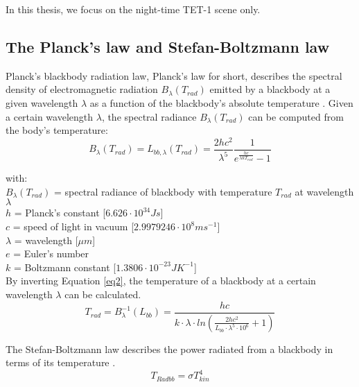 \noindent In this thesis, we focus on the night-time TET-1 scene only. \\


\subsection{The Planck's law and Stefan-Boltzmann law}
Planck's blackbody radiation law, Planck's law for short, describes the spectral density of electromagnetic radiation $B_{\lambda}(T_{rad})$ emitted by a blackbody at a given wavelength $\lambda$ as a function of the blackbody's absolute temperature \parencite{Reference208}. Given a certain wavelength $\lambda$, the spectral radiance $B_{\lambda}(T_{rad})$ can be computed from the body's temperature:\\
\begin{equation}
\label{eq2}
B_{\lambda}(T_{rad}) = L_{bb, \lambda}(T_{rad}) = \frac{2hc^2}{\lambda ^5} \frac{1}{e^{\frac{hc}{\lambda k T_{rad}}} - 1}
\end{equation}

\noindent with:\\
\indent $B_{\lambda}(T_{rad})$ = spectral radiance of blackbody with temperature $T_{rad}$ at wavelength $\lambda$\\
\indent $h$ = Planck's constant [$6.626 \cdot 10^{34} J s$]\\
\indent $c$ = speed of light in vacuum [$2.9979246 \cdot 10^8 m s^{-1}$]\\
\indent $\lambda$ = wavelength [$\mu m$]\\
\indent $e$ = Euler's number\\
\indent $k$ = Boltzmann constant [$1.3806 \cdot 10^{-23} J K^{-1}$]\\

\noindent By inverting Equation \eqref{eq2}, the temperature of a blackbody at a certain wavelength $\lambda$ can be calculated.\\
\begin{equation}
\label{eq3}
T_{rad} = B_{\lambda}^{-1}(L_{bb}) = \frac{hc}{k \cdot \lambda \cdot ln(\frac{2hc^2}{L_{bb} \cdot \lambda ^5 \cdot 10^6} + 1)}
\end{equation}

\noindent The Stefan-Boltzmann law describes the power radiated from a blackbody in terms of its temperature \parencite{Reference201, Reference209}.\\
\begin{equation}
\label{eq4}
T_{Radbb} = \sigma T_{kin}^4
\end{equation}

